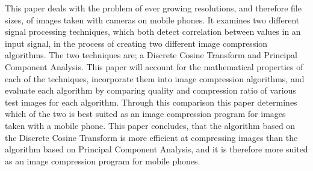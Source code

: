 This paper deals with the problem of ever growing resolutions, and therefore file sizes, of images taken with cameras on mobile phones. It examines two different signal processing techniques, which both detect correlation between values in an input signal, in the process of creating two different image compression algorithms. The two techniques are; a Discrete Cosine Transform and Principal Component Analysis. This paper will account for the mathematical properties of each of the techniques, incorporate them into image compression algorithms, and evaluate each algorithm by comparing quality and compression ratio of various test images for each algorithm. Through this comparison this paper determines which of the two is best suited as an image compression program for images taken with a mobile phone. This paper concludes, that the algorithm based on the Discrete Cosine Transform is more efficient at compressing images than the algorithm based on Principal Component Analysis, and it is therefore more suited as an image compression program for mobile phones.